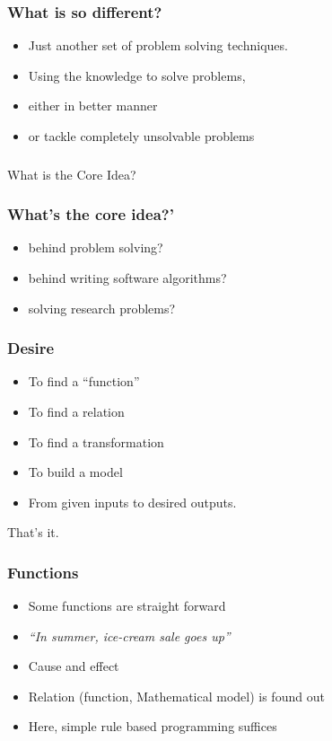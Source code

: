 \begin{frame}[fragile]\frametitle{What is so different?}
\begin{itemize}
\item Just another set of problem solving techniques.
\item Using the knowledge to solve problems, 
\item either in better manner
\item or tackle completely unsolvable problems 
\end{itemize}
\end{frame}

\begin{frame}[fragile]\frametitle{}
\begin{center}
{\Large What is the Core Idea?}
\end{center}
\end{frame}

\begin{frame}[fragile]\frametitle{What's the core idea?'}
\begin{itemize}
\item behind problem solving?
\item behind writing software algorithms?
\item solving research problems?
\end{itemize}
\end{frame}

\begin{frame}[fragile]\frametitle{Desire}
\begin{itemize}
\item To find a ``function''
\item To find a relation
\item To find a transformation
\item To build a model
\item From given inputs to desired outputs.
\end{itemize}
That's it.
\end{frame}

\begin{frame}[fragile]\frametitle{Functions}
\begin{itemize}
\item Some functions are straight forward
\item {\em ``In summer, ice-cream sale goes up''}
\item Cause and effect
\item Relation (function, Mathematical model) is found out
\item Here, simple rule based programming suffices
\end{itemize}
\end{frame}

